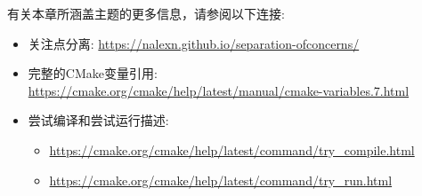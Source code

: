 

有关本章所涵盖主题的更多信息，请参阅以下连接:

\begin{itemize}
\item 
关注点分离: \url{https://nalexn.github.io/separation-ofconcerns/}

\item 
完整的CMake变量引用: \url{https://cmake.org/cmake/help/latest/manual/cmake-variables.7.html}

\item 
尝试编译和尝试运行描述:
\begin{itemize}
\item 
\url{https://cmake.org/cmake/help/latest/command/try_compile.html}

\item 
\url{https://cmake.org/cmake/help/latest/command/try_run.html}
\end{itemize}
\end{itemize}
